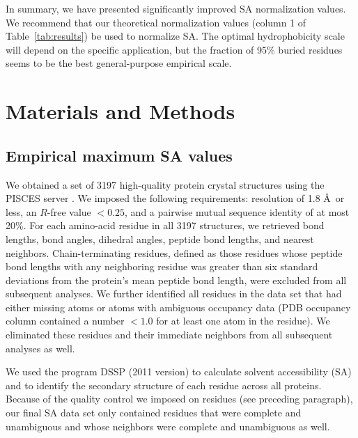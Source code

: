 \documentclass[11pt]{article}
\begin{document}
In summary, we have presented significantly improved SA normalization values. We recommend that our theoretical normalization values (column 1 of Table~\ref{tab:results}) be used to normalize SA. The optimal hydrophobicity scale will depend on the specific application, but the fraction of 95\% buried residues seems to be the best general-purpose empirical scale.


\section*{Materials and Methods}

\subsection*{Empirical maximum SA values}

We obtained a set of 3197 high-quality protein crystal structures using the PISCES server \cite{WangDunbrack2003}. We imposed the following requirements: resolution of 1.8 \AA\ or less, an $R$-free value $<0.25$, and a pairwise mutual sequence identity of at most 20\%. For each amino-acid residue in all 3197 structures, we retrieved bond lengths, bond angles, dihedral angles, peptide bond lengths, and nearest neighbors. Chain-terminating residues, defined as those residues whose peptide bond lengths with any neighboring residue was greater than six standard deviations from the protein's mean peptide bond length, were excluded from all subsequent analyses. We further identified all residues in the data set that had either missing atoms or atoms with ambiguous occupancy data (PDB occupancy column contained a number $<1.0$ for at least one atom in the residue). We eliminated these residues and their immediate neighbors from all subsequent analyses as well.

We used the program DSSP (2011 version) \cite{Kabsch1983} to calculate solvent accessibility (SA) and to identify the secondary structure of each residue across all proteins. Because of the quality control we imposed on residues (see preceding paragraph), our final SA data set only contained residues that were complete and unambiguous and whose neighbors were complete and unambiguous as well.
\end{document}
